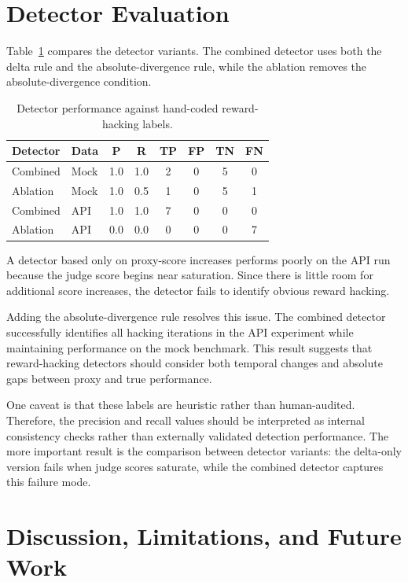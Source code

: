 \documentclass[11pt]{article}
\begin{document}
\section{Detector Evaluation}

Table~\ref{tab:detector} compares the detector variants. The combined detector uses both the delta rule and the absolute-divergence rule, while the ablation removes the absolute-divergence condition.

\begin{table}[H]
\centering
\caption{Detector performance against hand-coded reward-hacking labels.}
\label{tab:detector}
\begin{tabular}{llcccccc}
\toprule
Detector & Data & P & R & TP & FP & TN & FN \\
\midrule
Combined & Mock & 1.0 & 1.0 & 2 & 0 & 5 & 0 \\
Ablation & Mock & 1.0 & 0.5 & 1 & 0 & 5 & 1 \\
Combined & API & 1.0 & 1.0 & 7 & 0 & 0 & 0 \\
Ablation & API & 0.0 & 0.0 & 0 & 0 & 0 & 7 \\
\bottomrule
\end{tabular}
\end{table}

A detector based only on proxy-score increases performs poorly on the API run because the judge score begins near saturation. Since there is little room for additional score increases, the detector fails to identify obvious reward hacking.

Adding the absolute-divergence rule resolves this issue. The combined detector successfully identifies all hacking iterations in the API experiment while maintaining performance on the mock benchmark. This result suggests that reward-hacking detectors should consider both temporal changes and absolute gaps between proxy and true performance.

One caveat is that these labels are heuristic rather than human-audited. Therefore, the precision and recall values should be interpreted as internal consistency checks rather than externally validated detection performance. The more important result is the comparison between detector variants: the delta-only version fails when judge scores saturate, while the combined detector captures this failure mode.

\section{Discussion, Limitations, and Future Work}
\end{document}
